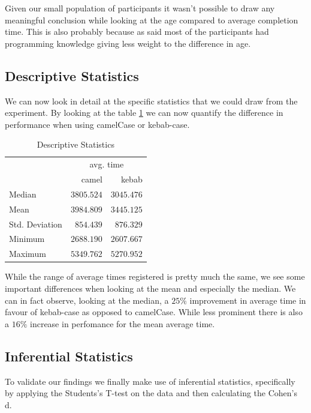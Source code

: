\documentclass{article}
\begin{document}
Given our small population of participants it wasn't possible to draw any meaningful conclusion while looking at the age compared to average
completion time. This is also probably because as said most of the participants had programming knowledge giving less weight to the difference in age.

\subsection{Descriptive Statistics}
We can now look in detail at the specific statistics that we could draw from the experiment. By looking at the table \ref{tab:descriptiveStatistics} we can now 
quantify the difference in performance when using camelCase or kebab-case.

\begin{table}[h]
    \centering
    \caption{Descriptive Statistics}
    \label{tab:descriptiveStatistics}
    {
        \begin{tabular}{lrr}
            \toprule
            \multicolumn{1}{c}{} & \multicolumn{2}{c}{avg. time} \\
            \cline{2-3}
             & camel & kebab  \\
            \cmidrule[0.4pt]{1-3}
            Median & $3805.524$ & $3045.476$  \\
            Mean & $3984.809$ & $3445.125$  \\
            Std. Deviation & $854.439$ & $876.329$  \\
            Minimum & $2688.190$ & $2607.667$  \\
            Maximum & $5349.762$ & $5270.952$  \\
            \bottomrule
        \end{tabular}
    }
\end{table}

While the range of average times registered is pretty much the same, we see some important differences when looking at the mean and especially the median.
We can in fact observe, looking at the median, a $25\%$ improvement in average time in favour of kebab-case as opposed to camelCase. While less prominent there is 
also a $16\%$ increase in perfomance for the mean average time.

\subsection{Inferential Statistics}
To validate our findings we finally make use of inferential statistics, specifically by applying the Students's T-test on the data and then 
calculating the Cohen's d. 
\end{document}
